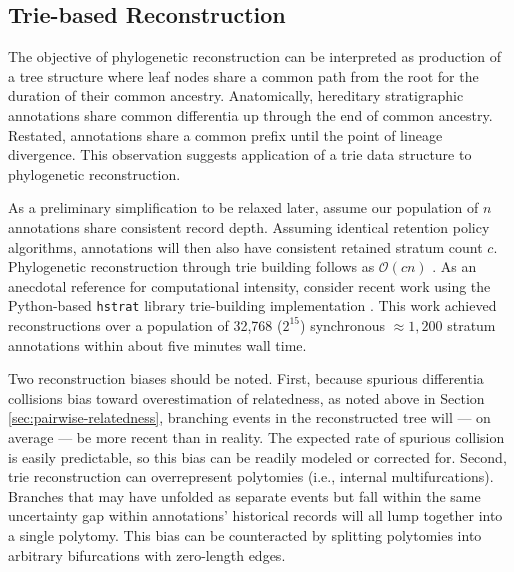\subsection{Trie-based Reconstruction}
\label{sec:trie-based-reconstruction}

The objective of phylogenetic reconstruction can be interpreted as production of a tree structure where leaf nodes share a common path from the root for the duration of their common ancestry.
Anatomically, hereditary stratigraphic annotations share common differentia up through the end of common ancestry.
Restated, annotations share a common prefix until the point of lineage divergence.
This observation suggests application of a trie data structure \citep{fredkin1960trie} to phylogenetic reconstruction.

As a preliminary simplification to be relaxed later, assume our population of $n$ annotations share consistent record depth.
Assuming identical retention policy algorithms, annotations will then also have consistent retained stratum count $c$.
Phylogenetic reconstruction through trie building follows as $\mathcal{O}(c n)$ \citep{mehta2018handbook}.
As an anecdotal reference for computational intensity, consider recent work using the Python-based \texttt{hstrat} library trie-building implementation \citep{moreno2023toward}.
This work achieved reconstructions over a population of 32,768 ($2^15$) synchronous $\approx 1,200$ stratum annotations within about five minutes wall time.

Two reconstruction biases should be noted.
First, because spurious differentia collisions bias toward overestimation of relatedness, as noted above in Section \ref{sec:pairwise-relatedness}, branching events in the reconstructed tree will --- on average --- be more recent than in reality.
The expected rate of spurious collision is easily predictable, so this bias can be readily modeled or corrected for.
Second, trie reconstruction can overrepresent polytomies (i.e., internal multifurcations).
Branches that may have unfolded as separate events but fall within the same uncertainty gap within annotations' historical records will all lump together into a single polytomy.
This bias can be counteracted by splitting polytomies into arbitrary bifurcations with zero-length edges.

